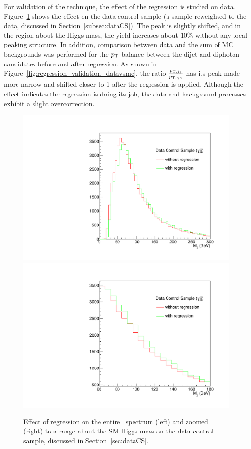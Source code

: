 For validation of the technique, the effect of the regression is studied on data.
Figure~\ref{fig:regression_plots_dataCS_mjj} shows the effect on the data control sample
(a \gjjj sample reweighted to the \ggjj data, discussed in Section~\ref{subsec:dataCS}). The peak
is slightly shifted, and in the region about the Higgs mass, the yield increases about 10\% without
any local peaking structure. 
In addition, comparison between data and the sum of MC backgrounds was performed for the $p_{\rm T}$
balance between the dijet and diphoton candidates before and after regression.
As shown in Figure~\ref{fig:regression_validation_datavsmc}, the ratio
$\frac{p_{{\rm T},jj}}{p_{{\rm T},\gamma\gamma}}$ has its peak made more narrow and shifted closer
to 1 after the regression is applied. Although the effect indicates the regression is doing its job,
the data and background processes exhibit a slight overcorrection.

\begin{figure}[ht]
\begin{center}
\includegraphics[width=.4\textwidth]{figures/objects/dataCS_mjj.pdf}
\includegraphics[width=.4\textwidth]{figures/objects/dataCS_mjj_zoom.pdf}
\end{center}
\caption{Effect of regression on the entire \Mjj\, spectrum (left) and zoomed (right)
to a range about the SM Higgs mass on the data control sample, discussed in Section~\ref{sec:dataCS}.}
\label{fig:regression_plots_dataCS_mjj} 
\end{figure}

